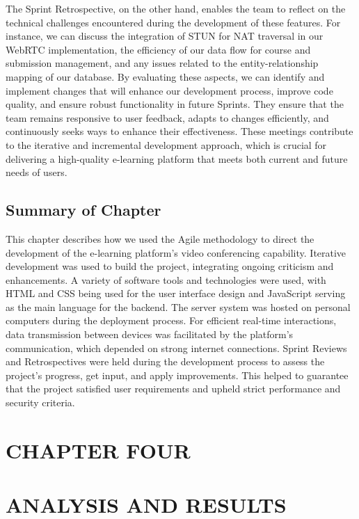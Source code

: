 \documentclass[a4paper,12pt]{article}  %
\begin{document}
The Sprint Retrospective, on the other hand, enables the team to reflect on the technical challenges encountered during the development of these features. For instance, we can discuss the integration of STUN for NAT traversal in our WebRTC implementation, the efficiency of our data flow for course and submission management, and any issues related to the entity-relationship mapping of our database. By evaluating these aspects, we can identify and implement changes that will enhance our development process, improve code quality, and ensure robust functionality in future Sprints. They ensure that the team remains responsive to user feedback, adapts to changes efficiently, and continuously seeks ways to enhance their effectiveness. These meetings contribute to the iterative and incremental development approach, which is crucial for delivering a high-quality e-learning platform that meets both current and future needs of users.

\subsection{Summary of Chapter}
This chapter describes how we used the Agile methodology to direct the development of the e-learning platform's video conferencing capability. Iterative development was used to build the project, integrating ongoing criticism and enhancements. A variety of software tools and technologies were used, with HTML and CSS being used for the user interface design and JavaScript serving as the main language for the backend. The server system was hosted on personal computers during the deployment process. For efficient real-time interactions, data transmission between devices was facilitated by the platform's communication, which depended on strong internet connections. Sprint Reviews and Retrospectives were held during the development process to assess the project's progress, get input, and apply improvements. This helped to guarantee that the project satisfied user requirements and upheld strict performance and security criteria.\\ \newpage

\begin{center}
      \section*{CHAPTER FOUR}
      \section{ANALYSIS AND RESULTS}
\end{center}
\end{document}
